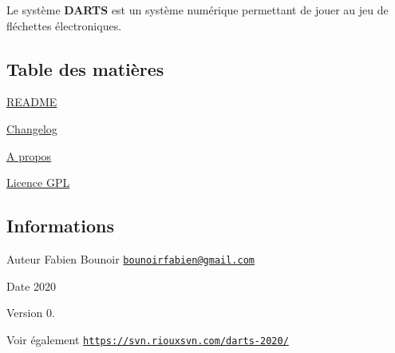 Le système {\bfseries D\+A\+R\+TS} est un système numérique permettant de jouer au jeu de fléchettes électroniques.\hypertarget{index_section_tdm}{}\subsection{Table des matières}\label{index_section_tdm}

\begin{DoxyItemize}
\item \hyperlink{page__r_e_a_d_m_e}{R\+E\+A\+D\+ME}
\item \hyperlink{page_changelog}{Changelog}
\item \hyperlink{page_about}{A propos}
\item \hyperlink{page_licence}{Licence G\+PL}
\end{DoxyItemize}\hypertarget{index_section_infos}{}\subsection{Informations}\label{index_section_infos}
\begin{DoxyAuthor}{Auteur}
Fabien Bounoir \href{mailto:bounoirfabien@gmail.com}{\tt bounoirfabien@gmail.\+com} 
\end{DoxyAuthor}
\begin{DoxyDate}{Date}
2020 
\end{DoxyDate}
\begin{DoxyVersion}{Version}
0. 
\end{DoxyVersion}
\begin{DoxySeeAlso}{Voir également}
\href{https://svn.riouxsvn.com/darts-2020/}{\tt https\+://svn.\+riouxsvn.\+com/darts-\/2020/} 
\end{DoxySeeAlso}
